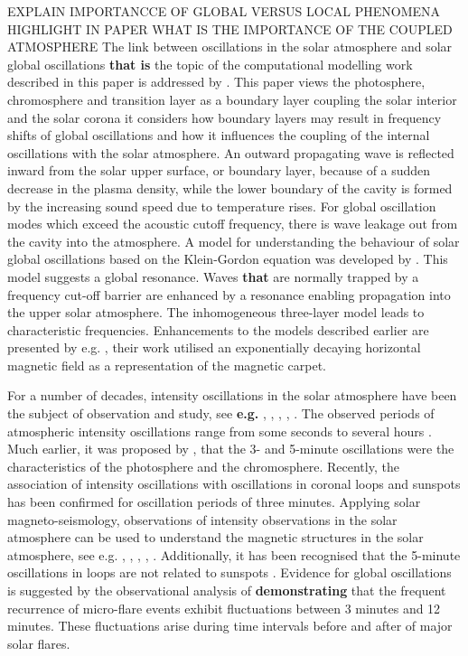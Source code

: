 \documentclass[physics,article,submit,pdftex,moreauthors]{Definitions/mdpi}
\begin{document}
EXPLAIN IMPORTANCCE OF GLOBAL VERSUS LOCAL PHENOMENA HIGHLIGHT IN PAPER WHAT IS THE IMPORTANCE OF THE COUPLED ATMOSPHERE
The link between oscillations in the solar atmosphere and solar global oscillations {\bf that is} the topic of the computational modelling work described in this paper is addressed by \citet{Erdelyi2006}. This paper views the photosphere, chromosphere and transition layer as a boundary layer coupling the solar interior and the solar corona it considers how boundary layers may result in frequency shifts of global oscillations and how it influences the coupling of the internal oscillations with the solar atmosphere. 
An outward propagating wave is reflected inward from the solar upper surface, or boundary layer, because of a sudden decrease in the plasma density, while the lower boundary of the cavity is formed by the increasing sound speed due to temperature rises. For global oscillation modes which exceed the acoustic cutoff frequency, there is wave leakage out from the cavity into the atmosphere. A model for understanding the behaviour of solar global oscillations based on the Klein-Gordon equation was developed by \citet{Taroyan2008}. This model suggests a global resonance. Waves {\bf that} are normally trapped by a frequency cut-off barrier are enhanced by a resonance enabling propagation into the upper solar atmosphere. The inhomogeneous three-layer model leads to characteristic frequencies. Enhancements to the models described earlier are presented by e.g. \citet{Pinter2007},  their work utilised an exponentially decaying horizontal magnetic field as a representation of the magnetic carpet. 
 
 For a number of decades, intensity oscillations in the solar atmosphere have been the subject of observation and study, see {\bf e.g.} \citet{Banerjee2011}, \citet{deMoortel2009}, \citet{Mathioudakis2013}, \citet{Ruderman2009}, \citet{Wang2011}. The observed periods of atmospheric intensity oscillations range from some seconds to several hours \citet{Auchere2014}. Much earlier, it was proposed by \citet{Jensen1963}, that the 3- and 5-minute oscillations were the characteristics of the photosphere and the chromosphere. Recently, the association of intensity oscillations with oscillations in coronal loops and sunspots has been confirmed for oscillation periods of three minutes. Applying solar magneto-seismology, observations of intensity observations in the solar atmosphere can be used to understand the magnetic structures in the solar atmosphere, see e.g. \citet{Roberts1984}, \citet{Banerjee2007}, \citet{Zaqarashvili2007}, \citet{Erdelyi2008}, \citet{Verth2010}.  Additionally, it has been recognised that the 5-minute oscillations in loops are not related to sunspots \citet{deMoortel2002}. Evidence for global oscillations is suggested by the observational analysis of \citet{Gyenge2018} {\bf demonstrating} that the frequent recurrence of micro-flare events exhibit fluctuations between 3 minutes and 12 minutes. These fluctuations arise during time intervals before and after of major solar flares.
\end{document}
